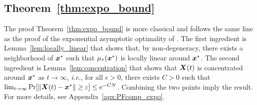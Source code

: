 \subsection{Theorem~\ref{thm:expo_bound}}

The proof Theorem~\ref{thm:expo_bound} is more classical and follows the same line as the proof of the exponential asymptotic optimality of \cite{GGY23,HXCW24}. The first ingredient is Lemma~\ref{lem:locally_linear} that
 shows that, by non-degeneracy, there exists a neighborhood of ${\bm{x}}^*$ such that $\mu_\tau({\bm{x}}^*)$ is locally linear around ${\bm{x}}^*$. The second ingredient is Lemma~\ref{lem:concentration}
 that shows that ${\bm{X}(t)}$ is concentrated around ${\bm{x}}^*$ as $t\to\infty$, \emph{i.e.}, for all $\epsilon>0$, there exists $C>0$ such that $\lim_{t\to\infty} \Pr[\|{\bm{X}(t)}-{\bm{x}}^*\|\ge \varepsilon]\le e^{-C N}$. Combining the two points imply the result. For more details, see %
 Appendix~\ref{apx:PFcomp_expo}.

